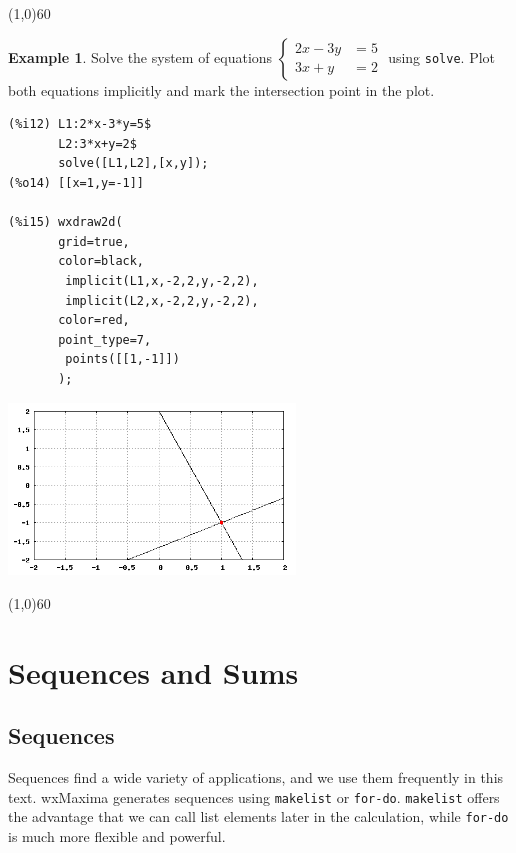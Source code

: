 \documentclass[10.5pt,twoside]{report}
\theoremstyle{definition}
\newtheorem{exmp}{Example}[section]
\begin{document}
\line(1,0){60}
\linethickness{0.5mm}

\begin{exmp} Solve the system of equations
$\begin{cases} 2x-3y&=5 \\ 3x+y&=2 \end{cases}$ using \verb|solve|.  Plot both equations implicitly and mark the intersection point in the plot.\\

\begin{verbatim}
(%i12) L1:2*x-3*y=5$
       L2:3*x+y=2$
       solve([L1,L2],[x,y]);
(%o14) [[x=1,y=-1]]

(%i15) wxdraw2d(
       grid=true,
       color=black,
        implicit(L1,x,-2,2,y,-2,2),
        implicit(L2,x,-2,2,y,-2,2),
       color=red,
       point_type=7,
        points([[1,-1]])
       );
\end{verbatim}

\includegraphics[width=3in]{example_0_4_3_1}

\end{exmp}


\line(1,0){60}
\linethickness{0.5mm}

\pagebreak

\section{Sequences and Sums}\label{Sequences and Sums}

\subsection{Sequences}

Sequences find a wide variety of applications, and we use them frequently in this text.  wxMaxima generates sequences using \verb|makelist| or \verb|for-do|.  \verb|makelist| offers the advantage that we can call list elements later in the calculation, while \verb|for-do| is much more flexible and powerful.
\end{document}
